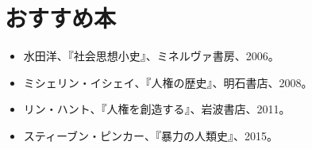 \documentclass[autodetect-engine,dvipdfmx-if-dvi,ja=standard]{bxjsarticle} \usepackage{mystyle}
\begin{document}
\section{おすすめ本}
\begin{itemize}
\item 水田洋、『社会思想小史』、ミネルヴァ書房、2006。
\item ミシェリン・イシェイ、『人権の歴史』、明石書店、2008。
\item リン・ハント、『人権を創造する』、岩波書店、2011。
\item スティーブン・ピンカー、『暴力の人類史』、2015。
  
\end{itemize}


\nocite{Pinker11:angel}
\nocite{hunt07:_inven_human_right}
\nocite{水田洋06:社会思想小史}
\nocite{ishay04:_histor_human_right}





\ifx\mybook\undefined
{}


\end{document}
